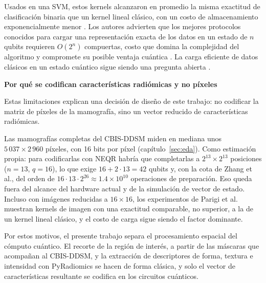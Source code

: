 Usados en una SVM, estos kernels alcanzaron en promedio la misma exactitud de clasificación binaria que un kernel lineal clásico, con un costo de almacenamiento exponencialmente menor \cite{Parigi2026QImR}.
Los autores advierten que los mejores protocolos conocidos para cargar una representación exacta de los datos en un estado de $n$ qubits requieren $O(2^n)$ compuertas, costo que domina la complejidad del algoritmo y compromete su posible ventaja cuántica \cite{Parigi2026QImR}.
La carga eficiente de datos clásicos en un estado cuántico sigue siendo una pregunta abierta \cite{Parigi2026QImR}.

\textbf{Por qué se codifican características radiómicas y no píxeles}

Estas limitaciones explican una decisión de diseño de este trabajo: no codificar la matriz de píxeles de la mamografía, sino un vector reducido de características radiómicas.

Las mamografías completas del CBIS-DDSM miden en mediana unos $5\,037 \times 2\,960$ píxeles, con 16 bits por píxel (capítulo~\ref{sec:eda}). Como estimación propia: para codificarlas con NEQR habría que completarlas a $2^{13} \times 2^{13}$ posiciones ($n = 13$, $q = 16$), lo que exige $16 + 2 \cdot 13 = 42$ qubits y, con la cota de Zhang et al., del orden de $16 \cdot 13 \cdot 2^{26} \approx 1.4 \times 10^{10}$ operaciones de preparación. Eso queda fuera del alcance del hardware actual y de la simulación de vector de estado. Incluso con imágenes reducidas a $16 \times 16$, los experimentos de Parigi et al. muestran kernels de imagen con una exactitud comparable, no superior, a la de un kernel lineal clásico, y el costo de carga sigue siendo el factor dominante.

Por estos motivos, el presente trabajo separa el procesamiento espacial del cómputo cuántico. El recorte de la región de interés, a partir de las máscaras que acompañan al CBIS-DDSM, y la extracción de descriptores de forma, textura e intensidad con PyRadiomics \cite{vanGriethuysen2017} se hacen de forma clásica, y solo el vector de características resultante se codifica en los circuitos cuánticos.

